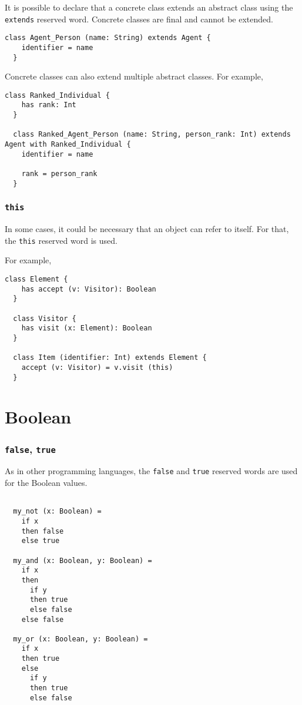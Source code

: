 \documentclass[12pt,a4paper]{book}
\newcommand{\srccode}[1]{\texttt{{#1}}}
\newcommand{\reservedWord}[1]{{\color{blue}\srccode{#1}}\xspace}
\newcommand{\sextends}{\reservedWord{extends}}
\newcommand{\sthis}{\reservedWord{this}}
\newcommand{\sfalse}{\reservedWord{false}}
\newcommand{\strue}{\reservedWord{true}}
\begin{document}
    It is possible to declare that a concrete class extends an abstract class using the \sextends reserved word.
    Concrete classes are final and cannot be extended.

    \begin{lstlisting}[label={lst:exampleExtends}]
  class Agent_Person (name: String) extends Agent {
    identifier = name
  }
    \end{lstlisting}

    Concrete classes can also extend multiple abstract classes.
    For example,
    \begin{lstlisting}[label={lst:exampleWith}]
  class Ranked_Individual {
    has rank: Int
  }

  class Ranked_Agent_Person (name: String, person_rank: Int) extends Agent with Ranked_Individual {
    identifier = name

    rank = person_rank
  }
    \end{lstlisting}

    \subsubsection{\sthis}

    In some cases, it could be necessary that an object can refer to itself.
    For that, the \sthis reserved word is used.

    For example,
    \begin{lstlisting}[label={lst:exampleExtendsElement}]
  class Element {
    has accept (v: Visitor): Boolean
  }

  class Visitor {
    has visit (x: Element): Boolean
  }

  class Item (identifier: Int) extends Element {
    accept (v: Visitor) = v.visit (this)
  }
    \end{lstlisting}


    \section{Boolean}

    \subsubsection{\sfalse, \strue}

    As in other programming languages, the \sfalse and \strue reserved words are used for the Boolean values.

    \begin{lstlisting}[label={lst:exampleFalseTrue}]

  my_not (x: Boolean) =
    if x
    then false
    else true

  my_and (x: Boolean, y: Boolean) =
    if x
    then
      if y
      then true
      else false
    else false

  my_or (x: Boolean, y: Boolean) =
    if x
    then true
    else
      if y
      then true
      else false
    \end{lstlisting}
\end{document}
